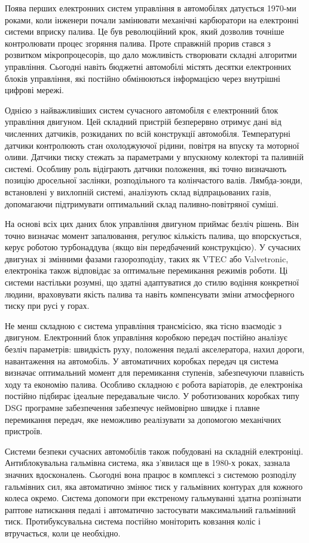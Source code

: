 \documentclass[14pt]{extreport}
\begin{document}
Поява перших електронних систем управління в автомобілях датується 1970-ми роками, коли інженери почали замінювати механічні карбюратори на електронні системи вприску палива. Це був революційний крок, який дозволив точніше контролювати процес згоряння палива. Проте справжній прорив стався з розвитком мікропроцесорів, що дало можливість створювати складні алгоритми управління. Сьогодні навіть бюджетні автомобілі містять десятки електронних блоків управління, які постійно обмінюються інформацією через внутрішні цифрові мережі.

Однією з найважливіших систем сучасного автомобіля є електронний блок управління двигуном. Цей складний пристрій безперервно отримує дані від численних датчиків, розкиданих по всій конструкції автомобіля. Температурні датчики контролюють стан охолоджуючої рідини, повітря на впуску та моторної оливи. Датчики тиску стежать за параметрами у впускному колекторі та паливній системі. Особливу роль відіграють датчики положення, які точно визначають позицію дросельної заслінки, розподільного та колінчастого валів. Лямбда-зонди, встановлені у вихлопній системі, аналізують склад відпрацьованих газів, допомагаючи підтримувати оптимальний склад паливно-повітряної суміші.

На основі всіх цих даних блок управління двигуном приймає безліч рішень. Він точно визначає момент запалювання, регулює кількість палива, що впорскується, керує роботою турбонаддува (якщо він передбачений конструкцією). У сучасних двигунах зі змінними фазами газорозподілу, таких як VTEC або Valvetronic, електроніка також відповідає за оптимальне перемикання режимів роботи. Ці системи настільки розумні, що здатні адаптуватися до стилю водіння конкретної людини, враховувати якість палива та навіть компенсувати зміни атмосферного тиску при русі у горах.

Не менш складною є система управління трансмісією, яка тісно взаємодіє з двигуном. Електронний блок управління коробкою передач постійно аналізує безліч параметрів: швидкість руху, положення педалі акселератора, нахил дороги, навантаження на автомобіль. У автоматичних коробках передач ця система визначає оптимальний момент для перемикання ступенів, забезпечуючи плавність ходу та економію палива. Особливо складною є робота варіаторів, де електроніка постійно підбирає ідеальне передавальне число. У роботизованих коробках типу DSG програмне забезпечення забезпечує неймовірно швидке і плавне перемикання передач, яке неможливо реалізувати за допомогою механічних пристроїв.

Системи безпеки сучасних автомобілів також побудовані на складній електроніці. Антиблокувальна гальмівна система, яка з'явилася ще в 1980-х роках, зазнала значних вдосконалень. Сьогодні вона працює в комплексі з системою розподілу гальмівних сил, яка автоматично змінює тиск у гальмівних контурах для кожного колеса окремо. Система допомоги при екстреному гальмуванні здатна розпізнати раптове натискання педалі і автоматично застосувати максимальний гальмівний тиск. Протибуксувальна система постійно моніторить ковзання коліс і втручається, коли це необхідно.
\end{document}
